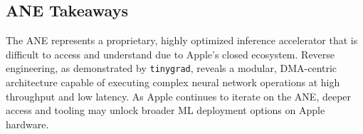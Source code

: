 \subsection{ANE Takeaways}

The ANE represents a proprietary, highly optimized inference accelerator that is difficult to access and understand due to Apple’s closed ecosystem. Reverse engineering, as demonstrated by \texttt{tinygrad}, reveals a modular, DMA-centric architecture capable of executing complex neural network operations at high throughput and low latency. As Apple continues to iterate on the ANE, deeper access and tooling may unlock broader ML deployment options on Apple hardware.
